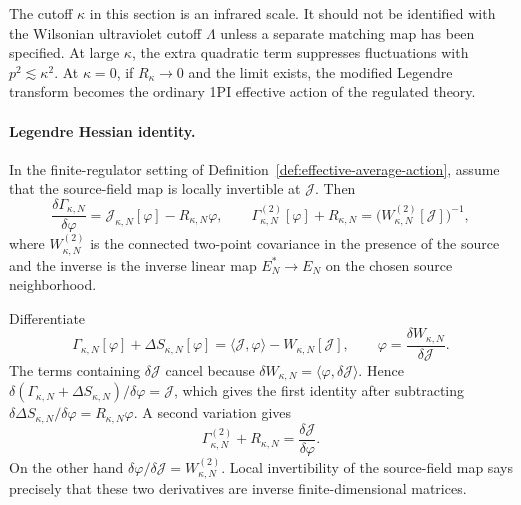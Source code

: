 The cutoff \(\kappa\) in this section is an infrared scale.  It should not be
identified with the Wilsonian ultraviolet cutoff \(\Lambda\) unless a
separate matching map has been specified.  At large \(\kappa\), the extra
quadratic term suppresses fluctuations with \(p^2\lesssim \kappa^2\).  At
\(\kappa=0\), if \(R_\kappa\to0\) and the limit exists, the modified Legendre
transform becomes the ordinary 1PI effective action of the regulated theory.

\paragraph{Legendre Hessian identity.}
In the finite-regulator setting of
Definition~\ref{def:effective-average-action}, assume that the source-field
map is locally invertible at \(\mathcal J\).  Then
\begin{equation}
  \frac{\delta\Gamma_{\kappa,N}}{\delta\varphi}
  =
  \mathcal J_{\kappa,N}[\varphi]-R_{\kappa,N}\varphi,
  \qquad
  \Gamma_{\kappa,N}^{(2)}[\varphi]+R_{\kappa,N}
  =
  \bigl(W_{\kappa,N}^{(2)}[\mathcal J]\bigr)^{-1},
  \label{eq:eaa-hessian-identity}
\end{equation}
where \(W_{\kappa,N}^{(2)}\) is the connected two-point covariance in the
presence of the source and the inverse is the inverse linear map
\(E_N^*\to E_N\) on the chosen source neighborhood.

Differentiate
\[
  \Gamma_{\kappa,N}[\varphi]+\Delta S_{\kappa,N}[\varphi]
  =
  \langle \mathcal J,\varphi\rangle-W_{\kappa,N}[\mathcal J],
  \qquad
  \varphi=\frac{\delta W_{\kappa,N}}{\delta\mathcal J}.
\]
The terms containing \(\delta\mathcal J\) cancel because
\(\delta W_{\kappa,N}=\langle\varphi,\delta\mathcal J\rangle\).  Hence
\(\delta(\Gamma_{\kappa,N}+\Delta S_{\kappa,N})/\delta\varphi=\mathcal J\),
which gives the first identity after subtracting
\(\delta\Delta S_{\kappa,N}/\delta\varphi=R_{\kappa,N}\varphi\).  A second
variation gives
\[
  \Gamma_{\kappa,N}^{(2)}+R_{\kappa,N}
  =
  \frac{\delta\mathcal J}{\delta\varphi}.
\]
On the other hand
\(\delta\varphi/\delta\mathcal J=W_{\kappa,N}^{(2)}\).  Local invertibility
of the source-field map says precisely that these two derivatives are inverse
finite-dimensional matrices.

